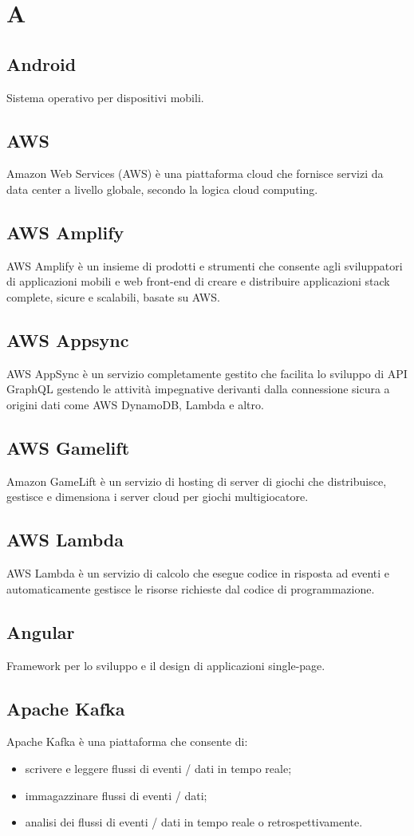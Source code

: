 \newpage \section{A}
\subsection{Android} Sistema operativo per dispositivi mobili.
\subsection{AWS} Amazon Web Services (AWS) è una piattaforma cloud che fornisce servizi da data center a livello globale, secondo la logica cloud computing.
\subsection{AWS Amplify} AWS Amplify è un insieme di prodotti e strumenti che consente agli sviluppatori di applicazioni mobili e web front-end di creare e distribuire applicazioni stack complete, sicure e scalabili, basate su AWS.
\subsection{AWS Appsync} AWS AppSync è un servizio completamente gestito che facilita lo sviluppo di API GraphQL gestendo le attività impegnative derivanti dalla connessione sicura a origini dati come AWS DynamoDB, Lambda e altro.
\subsection{AWS Gamelift} Amazon GameLift è un servizio di hosting di server di giochi che distribuisce, gestisce e dimensiona i server cloud per giochi multigiocatore.
\subsection{AWS Lambda} AWS Lambda è un servizio di calcolo che esegue codice in risposta ad eventi e automaticamente gestisce le risorse richieste dal codice di programmazione.
\subsection{Angular} Framework per lo sviluppo e il design di applicazioni single-page.
\subsection{Apache Kafka} Apache Kafka è una piattaforma che consente di:
\begin{itemize}
	\item scrivere e leggere flussi di eventi / dati in tempo reale;
	\item immagazzinare flussi di eventi / dati;
	\item analisi dei flussi di eventi / dati in tempo reale o retrospettivamente.
\end{itemize}
